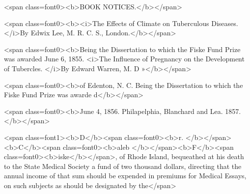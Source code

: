 <span class=font0><b>BOOK NOTICES.</b></span>

<span class=font0><b><i>The Effects of Climate on Tuberculous Diseases.   </i>By Edwix Lee, M. R. C. S., London.</b></span>

<span class=font0><b>Being the Dissertation to which the Fiske Fund Prize was awarded June 6, 1855.
<i>The Influence of Pregnancy on the Development of Tubercles.   </i>By Edward Warren, M. D »</b></span>

<span class=font0><b>of Edenton, N. C.   Being the Dissertation to which the Fiske Fund Prize was awarde d</b></span>

<span class=font0><b>June 4, 1856.   Philapelphia, Blanchard and Lea. 1857.</b></span>

<span class=font1><b>D</b><span class=font0><b>r. </b></span><b>C</b><span class=font0><b>aleb </b></span><b>F</b><span class=font0><b>iske</b></span>, of Rhode Island, bequeathed at his death to the
State Medical Society a fund of two thousand dollars, directing that
the annual income of that sum should be expended in premiums for
Medical Essays, on such subjects as should be designated by the</span>\endinput
